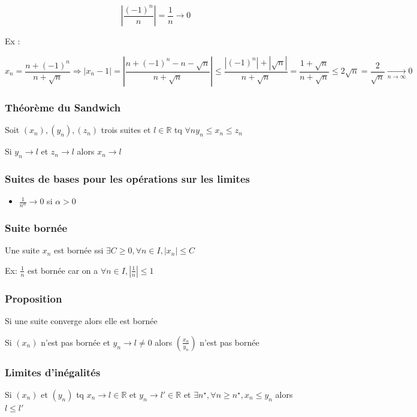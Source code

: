 \documentclass[a4paper,10pt]{article}
\newcommand{\ap}{\rightarrow}
\newcommand{\R}{\mathbb{R}}
\newcommand{\so}{\Rightarrow}
\newcommand{\conv}[1]{\mathop{\longrightarrow}\limits_{#1}}
\newcommand{\abs}[1]{\left\vert #1 \right\vert}
\begin{document}
$$\abs{\frac{(-1)^n}{n}} = \frac{1}{n} \ap 0$$

Ex :

$$x_n = \frac{n+(-1)^n}{n+\sqrt{n}} \so \abs{x_n -1} = \abs{\frac{n+(-1)^n-n-\sqrt{n}}{n+\sqrt{n}}} \leq \frac{\abs{(-1)^n}+\abs{\sqrt{n}}}{n+\sqrt{n}} = \frac{1+\sqrt{n}}{n+\sqrt{n}} \leq 2\sqrt{n} = \frac{2}{\sqrt{n}} \conv{n \ap \infty} 0$$

\subsubsection{Théorème du Sandwich}

Soit $(x_n), (y_n), (z_n)$ trois suites et $l \in \R$ tq $\forall n y_n \leq x_n \leq z_n$

Si $y_n \ap l$ et $z_n \ap l$ alors $x_n \ap l$

\subsubsection{Suites de bases pour les opérations sur les limites}

\begin{itemize}
	\item{$\frac{1}{n^\alpha} \ap 0$ si $\alpha > 0$}
\end{itemize}


\subsubsection{Suite bornée}

Une suite $x_n$ est bornée ssi $\exists C \geq 0, \forall n \in I, \abs{x_n} \leq C$

Ex: $\frac{1}{n}$ est bornée car on a $\forall n \in I, \abs{\frac{1}{n}} \leq 1$

\subsubsection{Proposition}

Si une suite converge alors elle est bornée

Si $(x_n)$ n'est pas bornée et $y_n \ap l \neq 0$ alors $\left( \frac{x_n}{y_n} \right)$ n'est pas bornée

\subsubsection{Limites d'inégalités}

Si $(x_n)$ et $(y_n)$ tq $x_n \ap l \in \R$ et $y_n \ap l' \in \R$ et $\exists n^\star, \forall n \geq n^\star, x_n \leq y_n$ alors $l \leq l'$
\end{document}
